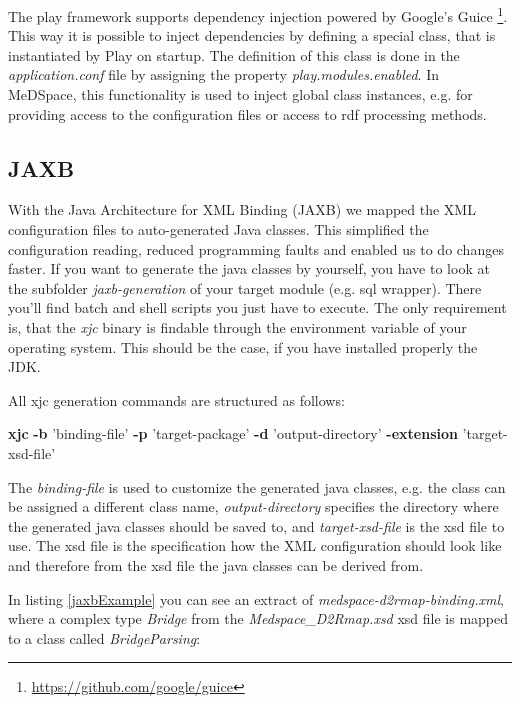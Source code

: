The play framework supports dependency injection powered by Google's Guice \footnote{\url{https://github.com/google/guice}}. This way it is possible to inject dependencies by defining a special class, that is instantiated by Play on startup. The definition of this class is done in the \emph{application.conf} file by assigning the property \emph{play.modules.enabled}. In MeDSpace, this functionality is used to inject global class instances, e.g. for providing access to the configuration files or access to rdf processing methods.

\subsection{JAXB}

With the Java Architecture for XML Binding \cite{JAXB} (JAXB) we mapped the XML configuration files to auto-generated Java classes. This simplified the configuration reading, reduced programming faults and enabled us to do changes faster. If you want to generate the java classes by yourself, you have to look at the subfolder \emph{jaxb-generation} of your target module (e.g. sql wrapper). There you'll find batch and shell scripts you just have to execute. The only requirement is, that the \emph{xjc} binary is findable through the environment variable of your operating system. This should be the case, if you have installed properly the JDK.

All xjc generation commands are structured as follows:

\begin{codebox}
	\textbf{xjc} \textbf{-b} 'binding-file' \textbf{-p} 'target-package' \textbf{-d} 'output-directory' \textbf{-extension} 'target-xsd-file'
\end{codebox}

The \emph{binding-file} is used to customize the generated java classes, e.g. the class can be assigned a different class name, \emph{output-directory} specifies the directory where the generated java classes should be saved to, and \emph{target-xsd-file} is the xsd file to use. The xsd file is the specification how the XML configuration should look like and therefore from the xsd file the java classes can be derived from.

In listing \ref{jaxbExample} you can see an extract of \emph{medspace-d2rmap-binding.xml}, where a complex type \emph{Bridge} from the \emph{Medspace\_D2Rmap.xsd} xsd file is mapped to a class called \emph{BridgeParsing}:

